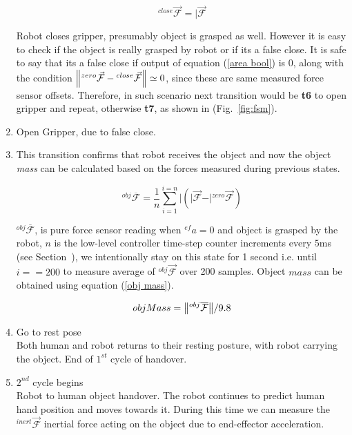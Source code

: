\begin{enumerate}[start=0,label={\bf{t}\arabic*:}]
        \begin{equation}\label{Fclose}
        {}^{close}\vec{\mathcal{F}} = \vert{\vec{\mathcal{F}}}
        \end{equation}
    
    Robot closes gripper, presumably object is grasped as well. However it is easy to check if the object is really grasped by robot or if its a false close. It is safe to say that its a false close if output of equation (\ref{area bool}) is $0$, along with the condition $\norm{{}^{zero}\vec{\mathcal{F}}-{}^{close}\vec{\mathcal{F}}} \simeq{0}$, since these are same measured force sensor offsets. Therefore, in such scenario next transition would be \textbf{t6} to open gripper and repeat, otherwise \textbf{t7}, as shown in (Fig.~\ref{fig:fsm}).
    
    \item Open Gripper, due to false close.
    
    \item This transition confirms that robot receives the object and now the object \textit{mass} can be calculated based on the forces measured during previous states.
    
    \begin{equation}
        {}^{obj}\overline{\mathcal{F}} = \frac{1}{n}\sum_{i=1}^{i=n} \vert{ (\vert{\vec{\mathcal{F}}} - \vert{{}^{zero}\vec{\mathcal{F}}}) }
    \end{equation}
    
    ${}^{obj}\overline{\mathcal{F}}$, is pure force sensor reading when ${}^{ef}a=0$ and object is grasped by the robot, $n$ is the low-level controller time-step counter increments every $5$ms (see Section~), we intentionally stay on this state for 1 second i.e. until $i==200$ to measure average of ${}^{obj}\vec{\mathcal{F}}$ over 200 samples. Object $mass$ can be obtained using equation (\ref{obj mass}).
    
    \begin{equation}\label{obj mass}
        objMass = \norm{{}^{obj}\overline{\mathcal{F}}}/9.8
    \end{equation}

    \item Go to rest pose \\
    Both human and robot returns to their resting posture, with robot carrying the object. End of $1^{st}$ cycle of handover.
    
    \item $2^{nd}$ cycle begins\\
    Robot to human object handover. The robot continues to predict human hand position and moves towards it. During this time we can measure the ${}^{inert}\vec{\mathcal{F}}$ inertial force acting on the object due to end-effector acceleration.


\end{enumerate}
